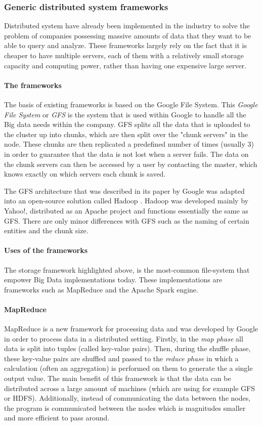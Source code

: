 \subsubsection{Generic distributed system frameworks}
Distributed system have already been implemented in the industry to solve the problem of companies possessing massive amounts of data that they want to be able to query and analyze. These frameworks largely rely on the fact that it is cheaper
to have multiple servers, each of them with a relatively small storage capacity and computing power, rather than having one expensive large server.

\paragraph{The frameworks}
The basis of existing frameworks is based on the Google File System\cite{Ghem03}. This \textit{Google File System} or \textit{GFS} is the system that is used within Google to handle all the Big data needs within the company. GFS splits all the data that is uploaded to the cluster up into chunks, which are then split over the "chunk servers" in the node. These chunks are then replicated a predefined number of times (usually 3) in order to guarantee that the data is not lost when a server fails. The data on the chunk servers can then be accessed by a user by contacting the master, which knows exactly on which servers each chunk is saved.\cite{Ghem03}

The GFS architecture that was described in its paper by Google was adapted into an open-source solution called Hadoop \cite{Shv10}. Hadoop was developed mainly by Yahoo!, distributed as an Apache project and functions essentially the same as GFS. There are only minor differences with GFS such as the naming of certain entities and the chunk size.

\paragraph{Uses of the frameworks}
The storage framework highlighted above, is the most-common file-system that empower Big Data implementations today. These implementations are frameworks such as MapReduce and the Apache Spark engine.

\paragraph{MapReduce}
MapReduce is a new framework for processing data and was developed by Google\cite{Dean04} in order to process data in a distributed setting. Firstly, in the \textit{map phase} all data is split into tuples (called key-value pairs). Then, during the shuffle phase, these key-value pairs are shuffled and passed to the \textit{reduce phase} in which a calculation (often an aggregation) is performed on them to generate the a single output value. The main benefit of this framework is that the data can be distributed across a large amount of machines (which are using for example GFS or HDFS). Additionally, instead of communicating the data between the nodes, the program is communicated between the nodes which is magnitudes smaller and more efficient to pass around.

